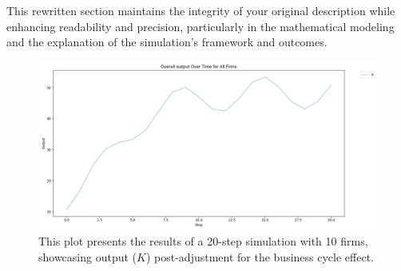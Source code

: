 \documentclass[12pt]{article}
\begin{document}
This rewritten section maintains the integrity of your original description while enhancing readability and precision,
particularly in the mathematical modeling and the explanation of the simulation's framework and outcomes.
\begin{figure}[ht]
    \centering
    \includegraphics[scale=0.5]{Output_noexit.png}
    \caption{This plot presents the results of a 20-step simulation with 10 firms, showcasing output (\(K \)) post-adjustment for the business cycle effect.}
    \label{fig:OutNoExit}
\end{figure}



    

\end{document}
